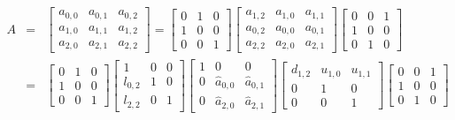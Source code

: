 \begin{eqnarray*}
A & = & 
\left \lbrack \begin{array}{ccc}
a_{0,0} & a_{0,1} & a_{0,2} \\
a_{1,0} & a_{1,1} & a_{1,2} \\
a_{2,0} & a_{2,1} & a_{2,2}
\end{array} \right \rbrack
 =
\left \lbrack \begin{array}{ccc}
0 & 1 & 0 \\
1 & 0 & 0 \\
0 & 0 & 1
\end{array} \right \rbrack
\left \lbrack \begin{array}{ccc}
a_{1,2} & a_{1,0} & a_{1,1} \\
a_{0,2} & a_{0,0} & a_{0,1} \\
a_{2,2} & a_{2,0} & a_{2,1}
\end{array} \right \rbrack
\left \lbrack \begin{array}{ccc}
0 & 0 & 1 \\
1 & 0 & 0 \\
0 & 1 & 0
\end{array} \right \rbrack \\
& = &
\left \lbrack \begin{array}{ccc}
0 & 1 & 0 \\
1 & 0 & 0 \\
0 & 0 & 1
\end{array} \right \rbrack
\left \lbrack \begin{array}{ccc}
1 & 0 & 0 \\
l_{0,2} & 1 & 0 \\
l_{2,2} & 0 & 1
\end{array} \right \rbrack
\left \lbrack \begin{array}{ccc}
1 & 0 & 0 \\
0 & {\hat a}_{0,0} & {\hat a}_{0,1} \\
0 & {\hat a}_{2,0} & {\hat a}_{2,1}
\end{array} \right \rbrack
\left \lbrack \begin{array}{ccc}
d_{1,2} & u_{1,0} & u_{1,1} \\
0 & 1 & 0 \\
0 & 0 & 1
\end{array} \right \rbrack
\left \lbrack \begin{array}{ccc}
0 & 0 & 1 \\
1 & 0 & 0 \\
0 & 1 & 0
\end{array} \right \rbrack \\

\end{eqnarray*}

